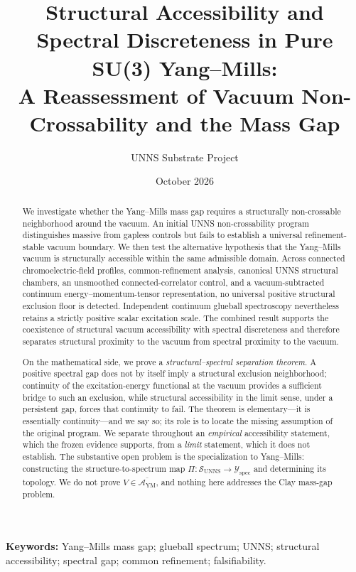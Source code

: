 \documentclass[11pt,a4paper]{article}
\title{\textbf{Structural Accessibility and Spectral Discreteness in Pure SU(3) Yang--Mills:}\\[2pt]
\large A \uns{} Reassessment of Vacuum Non-Crossability and the Mass Gap}
\author{UNNS Substrate Project}
\date{October 2026}
\theoremstyle{definition}
\theoremstyle{remark}
\newcommand{\AYM}{\mathcal{A}_{\mathrm{YM}}}
\newcommand{\SUNNS}{\mathcal{S}_{\mathrm{UNNS}}}
\newcommand{\Yspec}{\mathcal{Y}_{\mathrm{spec}}}
\newcommand{\uns}{UNNS}
\begin{document}
\maketitle

\begin{abstract}
\noindent We investigate whether the Yang--Mills mass gap requires a structurally non-crossable neighborhood around the vacuum. An initial \uns{} non-crossability program distinguishes massive from gapless controls but fails to establish a universal refinement-stable vacuum boundary. We then test the alternative hypothesis that the Yang--Mills vacuum is structurally accessible within the same admissible domain. Across connected chromoelectric-field profiles, common-refinement analysis, canonical \uns{} structural chambers, an unsmoothed connected-correlator control, and a vacuum-subtracted continuum energy--momentum-tensor representation, no universal positive structural exclusion floor is detected. Independent continuum glueball spectroscopy nevertheless retains a strictly positive scalar excitation scale. The combined result supports the coexistence of structural vacuum accessibility with spectral discreteness and therefore separates structural proximity to the vacuum from spectral proximity to the vacuum.

\smallskip\noindent On the mathematical side, we prove a \emph{structural--spectral separation theorem}. A positive spectral gap does not by itself imply a structural exclusion neighborhood; continuity of the excitation-energy functional at the vacuum provides a sufficient bridge to such an exclusion, while structural accessibility in the limit sense, under a persistent gap, forces that continuity to fail. The theorem is elementary---it is essentially continuity---and we say so; its role is to locate the missing assumption of the original program. We separate throughout an \emph{empirical} accessibility statement, which the frozen evidence supports, from a \emph{limit} statement, which it does not establish. The substantive open problem is the specialization to Yang--Mills: constructing the structure-to-spectrum map $\Pi:\SUNNS\to\Yspec$ and determining its topology. We do not prove $V\in\overline{\AYM}$, and nothing here addresses the Clay mass-gap problem.
\end{abstract}

\vspace{2pt}
\noindent\textbf{Keywords:} Yang--Mills mass gap; glueball spectrum; UNNS; structural accessibility; spectral gap; common refinement; falsifiability.
\end{document}

